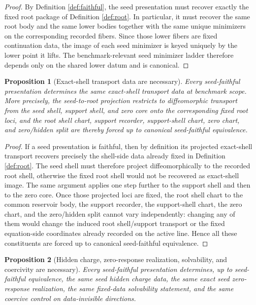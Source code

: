 \documentclass[11pt]{article}
\newtheorem{proposition}{Proposition}
\begin{document}
\begin{proof}
By Definition \ref{def:faithful}, the seed presentation must recover exactly the fixed root package of Definition \ref{def:root}. In particular, it must recover the same root body and the same lower bodies together with the same unique minimizers on the corresponding recorded fibers. Since those lower fibers are fixed continuation data, the image of each seed minimizer is keyed uniquely by the lower point it lifts. The benchmark-relevant seed minimizer ladder therefore depends only on the shared lower datum and is canonical.
\end{proof}

\begin{proposition}[Exact-shell transport data are necessary]
\label{prop:shell}
Every seed-faithful presentation determines the same exact-shell transport data at benchmark scope. More precisely, the seed-to-root projection restricts to diffeomorphic transport from the seed shell, support shell, and zero core onto the corresponding fixed root loci, and the root shell chart, support recorder, support-shell chart, zero chart, and zero/hidden split are thereby forced up to canonical seed-faithful equivalence.
\end{proposition}

\begin{proof}
If a seed presentation is faithful, then by definition its projected exact-shell transport recovers precisely the shell-side data already fixed in Definition \ref{def:root}. The seed shell must therefore project diffeomorphically to the recorded root shell, otherwise the fixed root shell would not be recovered as exact-shell image. The same argument applies one step further to the support shell and then to the zero core. Once those projected loci are fixed, the root shell chart to the common reservoir body, the support recorder, the support-shell chart, the zero chart, and the zero/hidden split cannot vary independently: changing any of them would change the induced root shell/support transport or the fixed equation-side coordinates already recorded on the active line. Hence all these constituents are forced up to canonical seed-faithful equivalence.
\end{proof}

\begin{proposition}[Hidden charge, zero-response realization, solvability, and coercivity are necessary]
\label{prop:hidden}
Every seed-faithful presentation determines, up to seed-faithful equivalence, the same seed hidden charge data, the same exact seed zero-response realization, the same fixed-data solvability statement, and the same coercive control on data-invisible directions.
\end{proposition}
\end{document}
